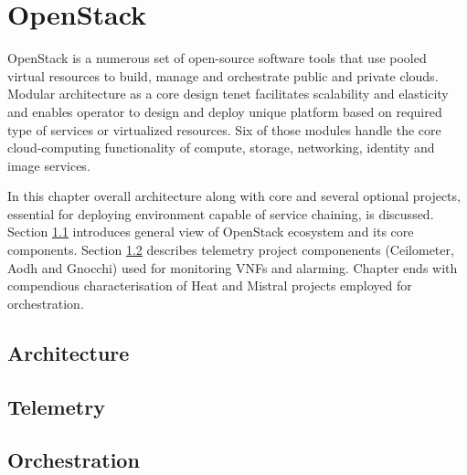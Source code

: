 \chapter{OpenStack}
\label{cha:openstack}

OpenStack is a numerous set of open-source software tools that use pooled virtual resources to build, manage and orchestrate public and private clouds. Modular architecture as a core design tenet facilitates scalability and elasticity and enables operator to design and deploy unique platform based on required type of services or virtualized resources. Six of those modules handle the core cloud-computing functionality of compute, storage, networking, identity and image services. \par
In this chapter overall architecture along with core and several optional projects, essential for deploying environment capable of service chaining, is discussed. Section \ref{sec:openstack_arch} introduces general view of OpenStack ecosystem and its core components. Section \ref{sec:telemetry} describes telemetry project componenents (Ceilometer, Aodh and Gnocchi) used for monitoring VNFs and alarming. Chapter ends with compendious characterisation of Heat and Mistral projects employed for orchestration.


\section{Architecture}
\label{sec:openstack_arch}

\cite{MAN02}


\section{Telemetry}
\label{sec:telemetry}

\cite{ART03}


\section{Orchestration}
\label{sec:orchestration}
